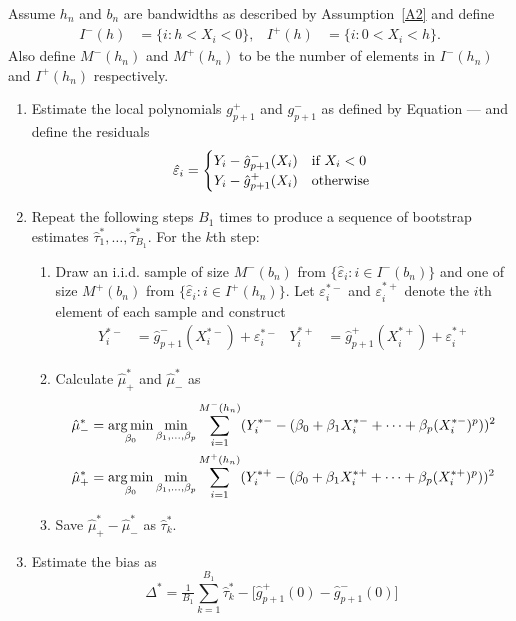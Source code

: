 \documentclass[12pt,fleqn]{article}
\begin{document}
\begin{algorithm}\label{Alg1}
  Assume $h_n$ and $b_n$ are bandwidths as described by Assumption~\ref{A2} and
  define
  \begin{align}
    I^-(h) &= \{i : h < X_i < 0\}, &
    I^+(h) &= \{i : 0 < X_i < h\}.
  \end{align}
  Also define $M^-(h_n)$ and $M^+(h_n)$ to be the number of elements in
  $I^-(h_n)$ and $I^+(h_n)$ respectively.
  \begin{enumerate}
  \item Estimate the local polynomials $g_{p+1}^+$ and $g_{p+1}^-$ as defined by
    Equation --- and define the residuals
    \begin{equation}
      \label{eq:1}
      \hat\varepsilon_i =
      \begin{cases}
        Y_i - \hat g_{p+1}^-(X_i) & \text{if}\ X_i < 0 \\
        Y_i - \hat g_{p+1}^+(X_i) & \text{otherwise}
      \end{cases}
    \end{equation}
  \item Repeat the following steps $B_1$ times to produce a sequence of bootstrap
    estimates $\hat\tau_1^*,\dots,\hat\tau_{B_1}^*$. For the $k$th step:
    \begin{enumerate}
    \item Draw an i.i.d. sample of size $M^-(b_n)$ from
      $\{\hat\varepsilon_i : i \in I^-(b_n)\}$ and one of size $M^+(b_n)$ from
      $\{\hat\varepsilon_i : i \in I^+(h_n)\}$. Let $\varepsilon_i^{*-}$ and
      $\varepsilon_i^{*+}$ denote the $i$th element of each sample and construct
      \begin{align}
        Y_i^{*-} &= \hat g_{p+1}^-(X_i^{*-}) + \varepsilon_i^{*-} &
        Y_i^{*+} &= \hat g_{p+1}^+(X_i^{*+}) + \varepsilon_i^{*+}
      \end{align}
    \item Calculate $\hat\mu_+^*$ and $\hat\mu_-^*$ as
      \begin{align}
        \hat\mu_-^*
        &= \operatorname*{arg\,min}_{\beta_0} \min_{\beta_1,\dots,\beta_p}
          \sum_{i = 1}^{M^-(h_n)} (Y_i^{*-} -
          (\beta_0 + \beta_1 X_i^{*-} + \cdots + \beta_p (X_i^{*-})^p))^2 \\
        \hat\mu_+^*
        &= \operatorname*{arg\,min}_{\beta_0} \min_{\beta_1,\dots,\beta_p}
          \sum_{i = 1}^{M^+(h_n)} (Y_i^{*+} -
          (\beta_0 + \beta_1 X_i^{*+} + \cdots + \beta_p (X_i^{*+})^p))^2
      \end{align}
    \item Save $\hat\mu_+^* - \hat\mu_-^*$ as $\hat\tau^*_k$.
    \end{enumerate}
  \item Estimate the bias as
    \begin{equation}
      \label{eq:2}
      \Delta^* = \tfrac{1}{B_1} \sum_{k=1}^{B_1} \hat\tau^*_k -
      \big[\hat g_{p+1}^+(0) - \hat g_{p+1}^-(0)\big]
    \end{equation}
  \end{enumerate}
\end{algorithm}
\end{document}

